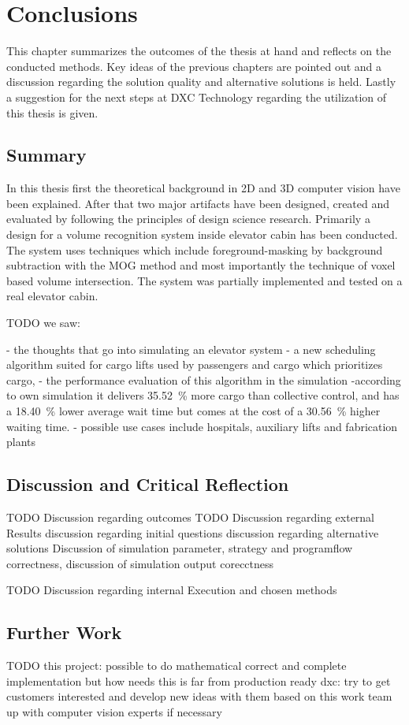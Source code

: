 \chapter{Conclusions}
\label{chap:concl}

This chapter summarizes the outcomes of the thesis at hand 
and reflects on the conducted methods.
Key ideas of the previous chapters are pointed out and a discussion regarding the solution quality and alternative solutions is held.
Lastly a suggestion for the next steps at DXC Technology regarding the utilization of this thesis is given.

\section{Summary}

In this thesis first the theoretical background in \ac{2D} and \ac{3D} computer vision have been explained.
After that two major artifacts have been designed, created and evaluated by following the principles of design science research.
Primarily a design for a volume recognition system inside elevator cabin has been conducted.
The system uses techniques which include foreground-masking by background subtraction with the \ac{MOG} method and most importantly the technique of voxel based volume intersection.
The system was partially implemented and tested on a real elevator cabin.



TODO
we saw:


- the thoughts that go into simulating an elevator system
- a new scheduling algorithm suited for cargo lifts used by passengers and cargo
which prioritizes cargo, 
- the performance evaluation of this algorithm in the simulation
-according to own simulation it delivers 35.52~\% more cargo than collective control, and has a 18.40~\% lower average wait time but comes at the cost of a 30.56~\% higher waiting time.
- possible use cases include hospitals, auxiliary lifts and fabrication plants

\section{Discussion and Critical Reflection}

TODO Discussion regarding outcomes
TODO Discussion regarding external Results
discussion regarding initial questions
discussion regarding alternative solutions
Discussion of simulation parameter, strategy and programflow correctness, discussion of simulation output corecctness

TODO  Discussion regarding internal Execution and chosen methods


\section{Further Work}

TODO
this project: possible to do mathematical correct and complete implementation
but how needs this is far from production ready
dxc: try to get customers interested and develop new ideas with them based on this work
team up with computer vision experts if necessary


